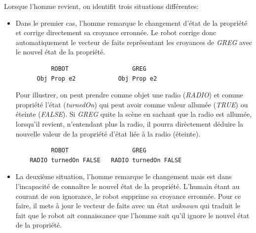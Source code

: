 \documentclass[a4paper,11pt,twoside]{StyleThese}
\begin{document}
Lorsque l'homme revient, on identifit trois situations différentes:

\begin{itemize}
\item Dans le premier cas, l'homme remarque le changement d'état de la propriété et corrige directement sa croyance erronnée. Le robot corrige donc automatiquement le vecteur de faits représentant les croyances de \textit{GREG} avec le nouvel état de la propriété. 


\begin{scriptsize}
\begin{verbatim}
          ROBOT                  GREG
      Obj Prop e2            Obj Prop e2
\end{verbatim}
\end{scriptsize}


Pour illustrer, on peut prendre comme objet une radio (\textit{RADIO}) et comme propriété l'état (\textit{turnedOn}) qui peut avoir comme valeur allumée (\textit{TRUE}) ou éteinte (\textit{FALSE}). Si \textit{GREG} quite la scène en sachant que la radio est allumée, lorsqu'il revient, n'entendant plus la radio, il pourra dirèctement déduire la nouvelle valeur de la propriété d'état liée à la radio (éteinte).


\begin{scriptsize}
\begin{verbatim}
          ROBOT                  GREG
    RADIO turnedOn FALSE   RADIO turnedOn FALSE
\end{verbatim}
\end{scriptsize}


\item La deuxième situation, l'homme remarque le changement mais est dans l'incapacité de connaître le nouvel état de la propriété. L'humain étant au courant de son ignorance, le robot supprime sa croyance erronnée. Pour ce faire, il mets à jour le vecteur de faits avec un état \textit{unknown} qui traduit le fait que le robot ait connaissance que l'homme sait qu'il ignore le nouvel état de la propriété.



\end{itemize}
\end{document}

